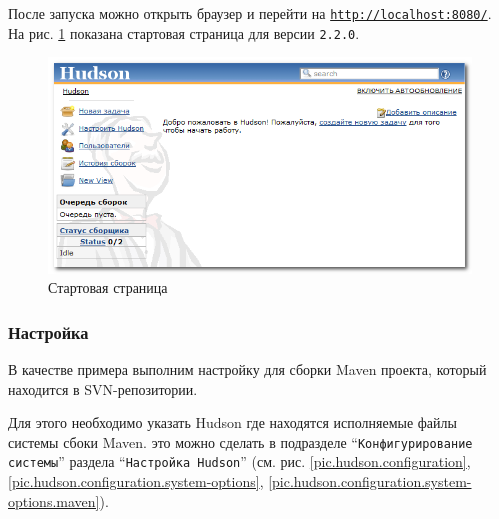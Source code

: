 \documentclass[a4paper,12pt]{article}
\begin{document}
После запуска можно открыть браузер и перейти на
\texttt{\href{http://localhost:8080/}{http://localhost:8080/}}. На
рис. \ref{pic.hudson.home} показана стартовая страница для версии \texttt{2.2.0}.

\begin{figure}[htp]
	\begin{center}
	  \includegraphics[scale = 1]{start.png}
	  \caption{Стартовая страница}
	  \label{pic.hudson.home}
	\end{center}
\end{figure}

\subsubsection{Настройка}

В качестве примера выполним настройку для сборки Maven проекта, который
находится в SVN-репозитории.

Для этого необходимо указать Hudson где находятся исполняемые файлы системы сбоки Maven. это можно сделать в подразделе
``\texttt{Конфигурирование системы}'' раздела  ``\texttt{Настройка Hudson}'' (см. рис. \ref{pic.hudson.configuration}, 
\ref{pic.hudson.configuration.system-options}, \ref{pic.hudson.configuration.system-options.maven}).
\end{document}
